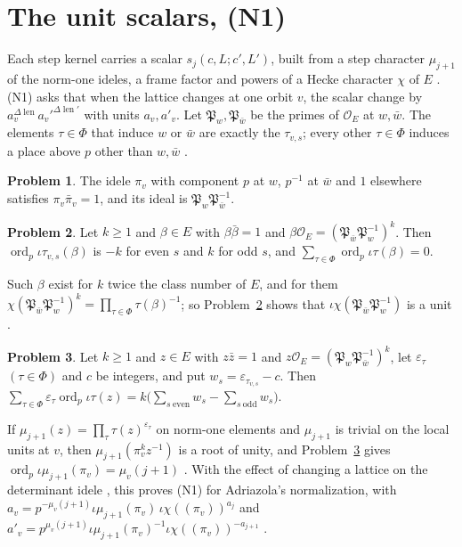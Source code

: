 \documentclass[reqno]{amsart}
\theoremstyle{definition}
\newtheorem{problem}{Problem}[section]
\theoremstyle{plain}
\theoremstyle{remark}
\newcommand{\Oc}{\mathcal O}
\newcommand{\len}{\operatorname{len}}
\newcommand{\ord}{\operatorname{ord}}
\begin{document}
\section{The unit scalars, (N1)}\label{sec:N1}
Each step kernel carries a scalar \(s_j(c,L;c',L')\), built from a step character \(\mu_{j+1}\) of the norm-one ideles, a frame factor and powers of a Hecke character \(\chi\) of \(E\) \cite[Def.~11.23]{Adr}.  (N1) asks that when the lattice changes at one orbit \(v\), the scalar change by \(a_v^{\Delta\len}a_v'^{\Delta\len'}\) with units \(a_v,a'_v\).  Let \(\mathfrak P_w,\mathfrak P_{\bar w}\) be the primes of \(\Oc_E\) at \(w,\bar w\).  The elements \(\tau\in\Phi\) that induce \(w\) or \(\bar w\) are exactly the \(\tau_{v,s}\); every other \(\tau\in\Phi\) induces a place above \(p\) other than \(w,\bar w\) \cite[proof of Lemma~11.25]{Adr}.

\begin{problem}\label{pr:pi-v}
The idele \(\pi_v\) with component \(p\) at \(w\), \(p^{-1}\) at \(\bar w\) and \(1\) elsewhere satisfies \(\pi_v\bar\pi_v=1\), and its ideal is \(\mathfrak P_w\mathfrak P_{\bar w}^{-1}\).
\end{problem}

\begin{problem}\label{pr:chi-count}
Let \(k\ge1\) and \(\beta\in E\) with \(\beta\bar\beta=1\) and \(\beta\Oc_E=(\mathfrak P_{\bar w}\mathfrak P_w^{-1})^k\).  Then \(\ord_p\iota\tau_{v,s}(\beta)\) is \(-k\) for even \(s\) and \(k\) for odd \(s\), and \(\sum_{\tau\in\Phi}\ord_p\iota\tau(\beta)=0\).
\end{problem}

Such \(\beta\) exist for \(k\) twice the class number of \(E\), and for them \(\chi(\mathfrak P_{\bar w}\mathfrak P_w^{-1})^k=\prod_{\tau\in\Phi}\tau(\beta)^{-1}\); so Problem~\ref{pr:chi-count} shows that \(\iota\chi(\mathfrak P_{\bar w}\mathfrak P_w^{-1})\) is a unit \cite[Lemma~11.30]{Adr}.

\begin{problem}\label{pr:mu-val}
Let \(k\ge1\) and \(z\in E\) with \(z\bar z=1\) and \(z\Oc_E=(\mathfrak P_w\mathfrak P_{\bar w}^{-1})^{k}\), let \(\varepsilon_\tau\) \((\tau\in\Phi)\) and \(c\) be integers, and put \(w_s=\varepsilon_{\tau_{v,s}}-c\).  Then \(\sum_{\tau\in\Phi}\varepsilon_\tau\ord_p\iota\tau(z)=k\big(\sum_{s\ \mathrm{even}}w_s-\sum_{s\ \mathrm{odd}}w_s\big)\).
\end{problem}

If \(\mu_{j+1}(z)=\prod_\tau\tau(z)^{\varepsilon_\tau}\) on norm-one elements and \(\mu_{j+1}\) is trivial on the local units at \(v\), then \(\mu_{j+1}(\pi_v^{k}z^{-1})\) is a root of unity, and Problem~\ref{pr:mu-val} gives \(\ord_p\iota\mu_{j+1}(\pi_v)=\mu_v(j+1)\) \cite[Lemma~11.25]{Adr}.  With the effect of changing a lattice on the determinant idele \cite[Lemma~11.26]{Adr}, this proves (N1) for Adriazola's normalization, with
\(a_v=p^{-\mu_v(j+1)}\iota\mu_{j+1}(\pi_v)\,\iota\chi((\pi_v))^{a_j}\) and \(a'_v=p^{\mu_v(j+1)}\iota\mu_{j+1}(\pi_v)^{-1}\iota\chi((\pi_v))^{-a_{j+1}}\) \cite[Prop.~11.27]{Adr}.
\end{document}

